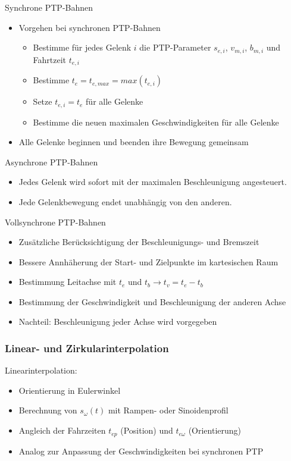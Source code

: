 \documentclass[paper=a4, fontsize=11pt]{scrartcl} %
\numberwithin{equation}{section} %
\numberwithin{figure}{section} %
\numberwithin{table}{section} %
\begin{document}
Synchrone PTP-Bahnen
\begin{itemize}
\item Vorgehen bei synchronen PTP-Bahnen
\begin{itemize}
\item Bestimme für jedes Gelenk $i$ die PTP-Parameter $s_{e,i}$, $v_{m,i}$, $b_{m,i}$ und Fahrtzeit $t_{e,i}$
\item Bestimme $t_e = t_{e,max} = max(t_{e,i})$
\item Setze $t_{e,i} = t_e$ für alle Gelenke
\item Bestimme die neuen maximalen Geschwindigkeiten für alle Gelenke
\end{itemize}
\item Alle Gelenke beginnen und beenden ihre Bewegung gemeinsam
\end{itemize}

Asynchrone PTP-Bahnen
\begin{itemize}
\item Jedes Gelenk wird sofort mit der maximalen Beschleunigung angesteuert.
\item Jede Gelenkbewegung endet unabhängig von den anderen.
\end{itemize}

Vollsynchrone PTP-Bahnen
\begin{itemize}
\item Zusätzliche Berücksichtigung der Beschleunigungs- und Bremszeit
\item Bessere Annhäherung der Start- und Zielpunkte im kartesischen Raum
\item Bestimmung Leitachse mit $t_e$ und $t_b \rightarrow t_v = t_e - t_b$
\item Bestimmung der Geschwindigkeit und Beschleunigung der anderen Achse
\item Nachteil: Beschleunigung jeder Achse wird vorgegeben
\end{itemize}

\subsubsection{Linear- und Zirkularinterpolation}

Linearinterpolation:
\begin{itemize}
\item Orientierung in Eulerwinkel
\item Berechnung von $s_\omega(t)$ mit Rampen- oder Sinoidenprofil
\item Angleich der Fahrzeiten $t_{ep}$ (Position) und $t_{e\omega}$ (Orientierung)
\item Analog zur Anpassung der Geschwindigkeiten bei synchronen PTP
\end{itemize}
\end{document}
